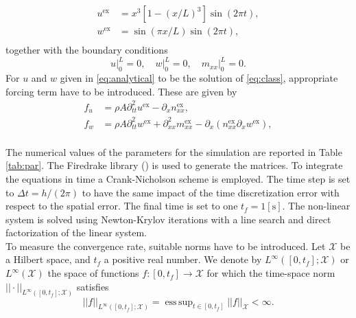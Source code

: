 \documentclass{ifacconf}
\DeclareMathOperator*{\esssup}{ess\,sup}
\begin{document}
\begin{equation}\label{eq:analytical}
	\begin{aligned}
		u^{\text{ex}} &= x^3[1-(x/L)^3] \sin(2 \pi t), \\
		w^{\text{ex}} &= \sin(\pi x/L)\sin(2 \pi t), \\
	\end{aligned}
\end{equation}
together with the boundary conditions
\begin{equation}
u\vert_0^L = 0, \quad w\vert_0^L =0, \quad m_{xx}\vert_{0}^L=0.
\end{equation}
For $u$ and $w$ given in \eqref{eq:analytical} to be the solution of \eqref{eq:class}, appropriate forcing term have to be introduced. These are given by 
\begin{equation}\label{eq:forcing}
	\begin{aligned}
		f_u &= \rho A \partial_{tt}^2 u^{\text{ex}} - \partial_x n_{xx}^{\text{ex}}, \\
		f_w &= \rho A \partial_{tt}^2 w^{\text{ex}} + \partial_{xx}^2 m_{xx}^{\text{ex}} - \partial_x(n_{xx}^{\text{ex}} \partial_x w^{\text{ex}}), \\
	\end{aligned}
\end{equation}

The numerical values of the parameters for the simulation are reported in Table \ref{tab:par}. The Firedrake library (\cite{rathgeber2017firedrake}) is used to generate the matrices. To integrate the equations in time a Crank-Nicholson scheme is employed. The time step is set to $\Delta t = h/(2 \pi)$ to have the same impact of the time discretization error with respect to the spatial error. The final time is set to one $t_f = 1 [\textrm{s}]$. The non-linear system is solved using Newton-Krylov iterations with a line search and direct factorization of the linear system.  \\

To measure the convergence rate,  suitable norms have to be introduced. 
Let $\mathcal{X}$ be a Hilbert space, and $t_f$ a positive real number. We denote by $L^\infty([0, t_f]; \mathcal{X})$ or $L^\infty(\mathcal{X})$ the space of functions $f: [0, t_f] \rightarrow \mathcal{X}$ for which the time-space norm $||\cdot||_{L^\infty([0, t_f]; \mathcal{X})}$ satisfies
\[
||f||_{L^\infty([0, t_f]; \mathcal{X})} = \esssup_{t \in [0,t_f]} ||f||_{\mathcal{X}} < \infty.
\]
\end{document}
